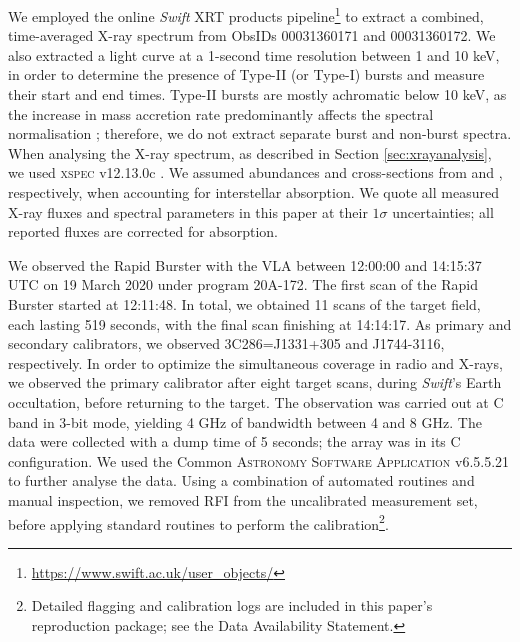 \documentclass[fleqn,usenatbib]{mnras}
\begin{document}
We employed the online \textit{Swift} XRT products pipeline\footnote{\url{https://www.swift.ac.uk/user_objects/}} \citep{evans2007} to extract a combined, time-averaged X-ray spectrum from ObsIDs 00031360171 and 00031360172. We also extracted a light curve at a 1-second time resolution between 1 and 10 keV, in order to determine the presence of Type-II (or Type-I) bursts and measure their start and end times. Type-II bursts are mostly achromatic below 10 keV, as the increase in mass accretion rate predominantly affects the spectral normalisation \citep{bagnoli2015}; therefore, we do not extract separate burst and non-burst spectra. When analysing the X-ray spectrum, as described in Section \ref{sec:xrayanalysis}, we used \textsc{xspec} v12.13.0c \citep{xspecref}. We assumed abundances and cross-sections from \citet{wilms2000} and \citet{vern1996}, respectively, when accounting for interstellar absorption. We quote all measured X-ray fluxes and spectral parameters in this paper at their $1\sigma$ uncertainties; all reported fluxes are corrected for absorption. 

We observed the Rapid Burster with the VLA between 12:00:00 and 14:15:37 UTC on 19 March 2020 under program 20A-172. The first scan of the Rapid Burster started at 12:11:48. In total, we obtained 11 scans of the target field, each lasting 519 seconds, with the final scan finishing at 14:14:17. As primary and secondary calibrators, we observed 3C286=J1331+305 and J1744-3116, respectively. In order to optimize the simultaneous coverage in radio and X-rays, we observed the primary calibrator after eight target scans, during \textit{Swift}'s Earth occultation, before returning to the target. The observation was carried out at C band in 3-bit mode, yielding 4 GHz of bandwidth between 4 and 8 GHz. The data were collected with a dump time of 5 seconds; the array was in its C configuration. We used the Common \textsc{Astronomy Software Application} v6.5.5.21 \citep[\textsc{CASA};][]{casa2022} to further analyse the data. Using a combination of automated routines and manual inspection, we removed RFI from the uncalibrated measurement set, before applying standard routines to perform the calibration\footnote{Detailed flagging and calibration logs are included in this paper's reproduction package; see the Data Availability Statement.}. 
\end{document}
